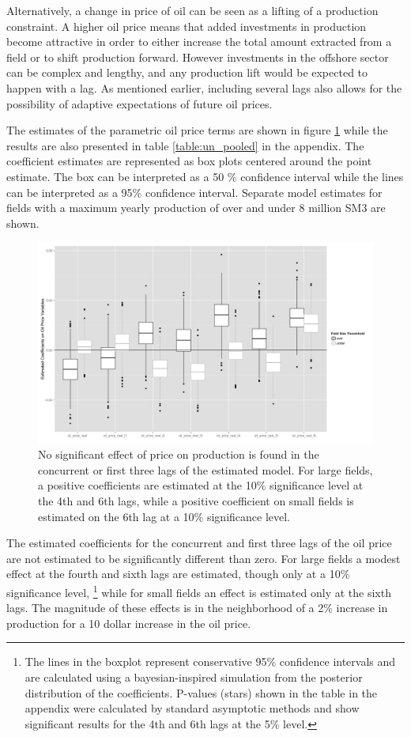 \documentclass[12pt]{article}
\begin{document}
Alternatively, a change in price of oil can be seen as a lifting of a production constraint.  A higher oil price means that added investments in production become attractive in order to either increase the total amount extracted from a field or to shift production forward.  However investments in the offshore sector can be complex and lengthy, and any production lift would be expected to happen with a lag.  As mentioned earlier, including several lags also allows for the possibility of adaptive expectations of future oil prices.

The estimates of the parametric oil price terms are shown in figure \ref{gam_price_dirty_box} while the results are also presented in table \ref{table:un_pooled} in the appendix.  The coefficient estimates are represented as box plots centered around the point estimate.  The box can be interpreted as a 50 \% confidence interval while the lines can be interpreted as a 95\% confidence interval.  Separate model estimates for fields with a maximum yearly production of over and under 8 million SM3 are shown.  

\begin{figure}
	\includegraphics[width=1\textwidth]{figures/gam_price_6_print.png}
	\caption{No significant effect of price on production is found in the concurrent or first three lags of the estimated model.  For large fields, a positive coefficients are estimated at the 10\% significance level at the 4th and 6th lags, while a positive coefficient on small fields is estimated on the 6th lag at a 10\% significance level.}
	\label{gam_price_dirty_box}
\end{figure}

The estimated coefficients for the concurrent and first three lags of the oil price are not estimated to be significantly different than zero.  For large fields a modest effect at the fourth and sixth lags are estimated, though only at a 10\% significance level, \footnote{The lines in the boxplot represent conservative 95\% confidence intervals and are calculated using a bayesian-inspired simulation from the posterior distribution of the coefficients.  P-values (stars) shown in the table in the appendix were calculated by standard asymptotic methods and show significant results for the 4th and 6th lags at the 5\% level.} while for small fields an effect is estimated only at the sixth lags. The magnitude of these effects is in the neighborhood of a 2\% increase in production for a 10 dollar increase in the oil price. 
\end{document}
